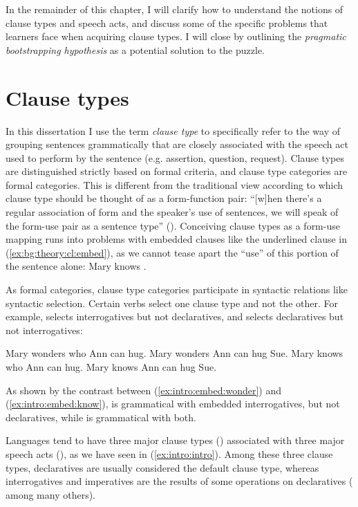 In the remainder of this chapter, I will clarify how to understand the notions of clause types and speech acts, and discuss some of the specific problems that learners face when acquiring clause types. I will close by outlining the \emph{pragmatic bootstrapping hypothesis} as a potential solution to the puzzle.

\section{Clause types}
\label{sec:bg:theory:clause}

 In this dissertation I use the term \emph{clause type} to specifically refer to the way of grouping sentences grammatically that are closely associated with the speech act used to perform by the sentence (e.g. assertion, question, request). Clause types are distinguished strictly based on formal criteria, and clause type categories are formal categories. This is different from the traditional view according to which clause type should be thought of as a form-function pair: ``[w]hen there's a regular association of form and the speaker's use of sentences, we will speak of the form-use pair as a sentence type'' (\cite[p.156]{sz1985speechact}). Conceiving clause types as a form-use mapping runs into problems with embedded clauses like the underlined clause in (\ref{ex:bg:theory:cl:embed}), as we cannot tease apart the ``use'' of  this portion of the sentence alone:
Mary knows .
\eex

As formal categories, clause type categories participate in syntactic relations like syntactic  selection. Certain verbs select one clause type and not the other. For example,  selects interrogatives but not declaratives, and  selects declaratives but not interrogatives:

\bxl
Mary wonders who Ann can hug.
\ex *Mary wonders Ann can hug Sue.
\exl
\ex \label{ex:intro:embed:know}
\bxl
Mary knows who Ann can hug.
\ex Mary knows Ann can hug Sue.
\exl
\eex

As shown by the contrast between (\ref{ex:intro:embed:wonder}) and (\ref{ex:intro:embed:know}),  is grammatical with embedded interrogatives, but not declaratives, while  is grammatical with both.



Languages tend to have three major clause types (\diis{}) associated with three major speech acts (\aqrs{}), as we have seen in (\ref{ex:intro:intro}). Among these three clause types, declaratives are usually considered the default clause type, whereas interrogatives and imperatives are the results of some operations on declaratives (\cite{sz1985speechact, chomsky1957,chomsky1995minimalist, akmajian1984clausetype, platzack1997imp,rizzi1997} among many others). 



